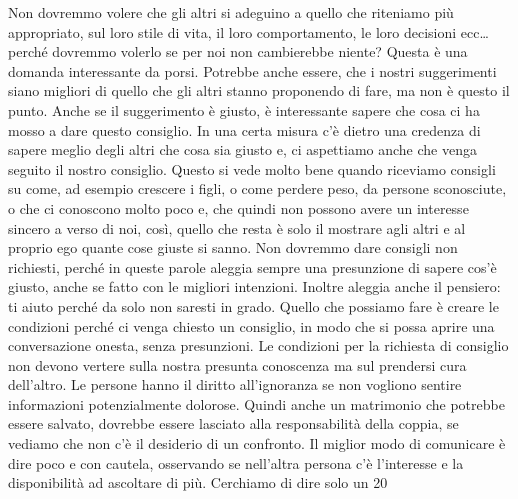 \documentclass[12pt]{book} %
\begin{document}
\bigskip
Non dovremmo volere che gli altri si adeguino a quello che
riteniamo più appropriato, sul loro stile di vita, il loro comportamento, le loro decisioni ecc… perché dovremmo
volerlo se per noi non cambierebbe niente? Questa è una domanda interessante da porsi. Potrebbe anche essere, che i
nostri suggerimenti siano migliori di quello che gli altri stanno proponendo di fare, ma non è questo il punto. Anche
se il suggerimento è giusto, è interessante sapere che cosa ci ha mosso a dare questo consiglio. In una certa misura
c'è dietro una credenza di sapere meglio degli altri che cosa sia giusto e, ci aspettiamo anche
che venga seguito il nostro consiglio. Questo si vede molto bene quando riceviamo consigli su come, ad esempio crescere
i figli, o come perdere peso, da persone sconosciute, o che ci conoscono molto poco e, che quindi non possono avere un
interesse sincero a verso di noi, così, quello che resta è solo il mostrare agli altri e al proprio ego quante cose
giuste si sanno. Non dovremmo dare consigli non richiesti, perché in queste parole aleggia sempre una presunzione di
sapere cos'è giusto, anche se fatto con le migliori intenzioni. Inoltre aleggia anche il pensiero:
ti aiuto perché da solo non saresti in grado. Quello che possiamo fare è creare le condizioni perché ci venga chiesto
un consiglio, in modo che si possa aprire una conversazione onesta, senza presunzioni. Le condizioni per la richiesta
di consiglio non devono vertere sulla nostra presunta conoscenza ma sul prendersi cura dell'altro.
Le persone hanno il diritto all'ignoranza se non vogliono sentire informazioni potenzialmente
dolorose. Quindi anche un matrimonio che potrebbe essere salvato, dovrebbe essere lasciato alla responsabilità della
coppia, se vediamo che non c'è il desiderio di un confronto. Il miglior modo di comunicare è dire
poco e con cautela, osservando se nell'altra persona c'è l'interesse e la disponibilità ad ascoltare di più.
Cerchiamo di dire solo un 20%

\bigskip
\end{document}
